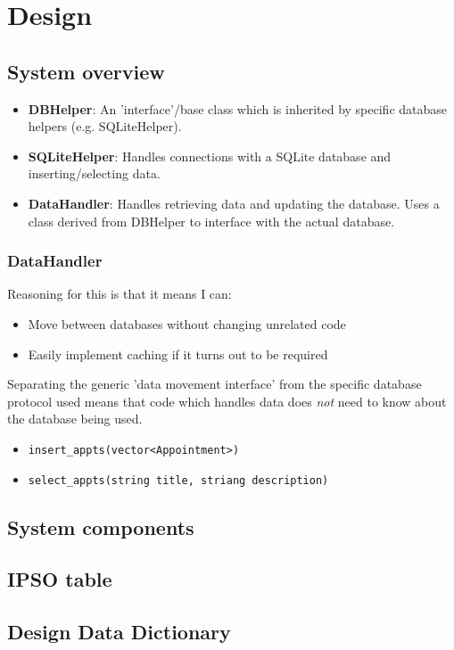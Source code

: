 \section{Design}
\subsection{System overview}

\begin{itemize}
    \item \textbf{DBHelper}: An 'interface'/base class which is inherited by
        specific database helpers (e.g. SQLiteHelper).
    \item \textbf{SQLiteHelper}: Handles connections with a SQLite database and
        inserting/selecting data.
    \item \textbf{DataHandler}: Handles retrieving data and updating the
        database. Uses a class derived from DBHelper to interface with the
        actual database.
\end{itemize}


\subsubsection{DataHandler}

Reasoning for this is that it means I can:

\begin{itemize}
    \item Move between databases without changing unrelated code
    \item Easily implement caching if it turns out to be required
\end{itemize}

Separating the generic 'data movement interface' from the specific database
protocol used means that code which handles data does \textit{not} need to know
about the database being used.

\begin{itemize}
    \item \verb+insert_appts(vector<Appointment>)+
    \item \verb+select_appts(string title, striang description)+
\end{itemize}


\subsection{System components}
\subsection{IPSO table}



\subsection{Design Data Dictionary}
